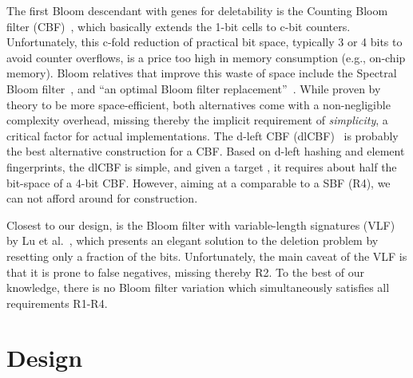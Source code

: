 \documentclass[conference]{IEEEtran}
\begin{document}
The first Bloom descendant with genes for deletability is the Counting Bloom filter (CBF)~\cite{343572}, which basically extends the 1-bit cells to c-bit counters.
Unfortunately, this c-fold reduction of practical bit space, typically 3 or 4 bits to avoid counter overflows, is a price too high in memory consumption (e.g., on-chip memory).  Bloom relatives that improve this waste of space include the Spectral Bloom filter~\cite{872787}, and ``an optimal Bloom filter replacement''~\cite{1070548}. While proven by theory to be more space-efficient, both alternatives come with a non-negligible complexity overhead, missing thereby the implicit requirement of \textit{simplicity}, a critical factor for actual implementations. 
The d-left CBF (dlCBF)~\cite{Bonomi06animproved} is probably the best alternative construction for a CBF. Based on d-left hashing and element fingerprints, the dlCBF is simple, and given a target , it requires about half the bit-space  of a 4-bit CBF. However, aiming at a  comparable to a SBF (R4), we can not afford 
  around  for construction. 

Closest to our design, is the Bloom filter with variable-length signatures (VLF) by Lu et al.~\cite{Lu05bloomfilters}, which presents an elegant solution to the deletion problem by resetting only a fraction of the  bits. Unfortunately, the main caveat of the VLF is that it is prone to false negatives, missing thereby R2. 
To the best of our knowledge, there is no Bloom filter variation which simultaneously satisfies all requirements R1-R4. 





\section{Design}
\label{sec:design}
\end{document}
